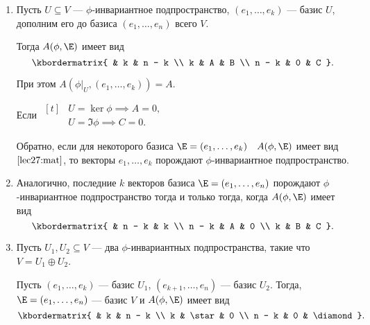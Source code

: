 \begin{enumerate}
    \item 
        Пусть $U \subseteq V$ --- $\phi$-инвариантное подпространство, $(e_1, \dots, e_k)$ --- базис $U$, дополним его до базиса $(e_1, \dots, e_n)$ всего $V$.
        
        Тогда $A(\phi, \E)$ имеет вид
        \begin{equation}
            \label{lec27:mat}
            \kbordermatrix{
                  & k & n - k \\
                k & A & B \\
                n - k & 0 & C
            }
        .\end{equation}

        При этом $A\left(\phi\big|_U, (e_1, \dots, e_k)\right) = A$.

        Если
        \begin{math}
            \begin{aligned}[t]
                &U = \ker \phi \implies A = 0, \\
                &U = \Im \phi \implies C = 0.
            \end{aligned}
        \end{math}

        Обратно, если для некоторого базиса $\E = (e_1, \dots, e_k) \quad A(\phi, \E)$ имеет вид $\eqref{lec27:mat}$, то векторы $e_1, \dots, e_k$ порождают $\phi$-инвариантное подпространство.

    \item
        Аналогично, последние $k$ векторов базиса $\E = (e_1, \dots, e_n)$ порождают $\phi$-инвариантное подпространство тогда и только тогда, когда $A(\phi, \E)$ имеет вид
        \begin{equation*}
            \kbordermatrix{
                  & n - k & k \\
                n - k & A & 0 \\
                k & B & C
            }
        .\end{equation*}

    \item 
        Пусть $U_1, U_2 \subseteq V$ --- два $\phi$-инвариантных подпространства, такие что $V = U_1 \oplus U_2$.
        
        Пусть $(e_1, \dots, e_k)$ --- базис $U_1$, $(e_{k + 1}, \dots, e_n)$ --- базис $U_2$.
        Тогда, $\E = (e_1, \dots, e_n)$ --- базис $V$ и $A(\phi, \E)$ имеет вид
        \begin{equation*}
            \kbordermatrix{
                      & k & n - k \\
                k     & \star & 0 \\
                n - k & 0 & \diamond
            }
        .\end{equation*}


\end{enumerate}
